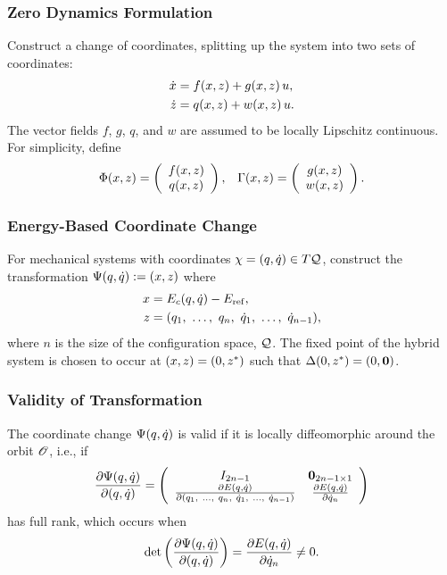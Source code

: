 \begin{frame}[t]
  \frametitle{Zero Dynamics Formulation}
  Construct a change of coordinates, splitting up the system into two sets of coordinates:
  \begin{align*}
    \dot {x} &= f(x, z) + g(x, z) \, u,\\
    \dot {z} &= q(x, z) + w(x, z) \, u.
  \end{align*}
  The vector fields $f$, $g$, $q$, and $w$ are assumed to be locally Lipschitz
  continuous. For simplicity, define
  \begin{align*}
    \Phi(x, z) = \left(\begin{array}{c}
        f(x, z)\\
        q(x, z)
      \end{array}\right),&&
    \Gamma (x, z) = \left(\begin{array}{c}
        g(x, z)\\
        w(x, z)
      \end{array}\right).
  \end{align*}
\end{frame}

\begin{frame}[t]
  \frametitle{Energy-Based Coordinate Change}
  For mechanical systems with coordinates $\chi = (q, \dot q) \in T\mathcal{Q}$, construct the transformation $\Psi(q, \dot q) := (x, z)$ where
  \begin{align*}
    x &= E_{c}(q, \dot q) - E_{\mathrm{ref}},\\
    z &= (q_{1}, \ \ldots, \ q_{n}, \ \dot q_{1}, \ \ldots, \ \dot q_{n-1}),
  \end{align*}
  where $n$ is the size of the configuration space, $\mathcal{Q}$. The fixed point of the
  hybrid system is chosen to occur at $(x, z) = (0, z^{*})$ such that $\Delta(0, z^{*}) =
  (0, {\mathbf 0})$.
\end{frame}

\begin{frame}[t]
  \frametitle{Validity of Transformation}
  The coordinate change $\Psi(q, \dot q)$ is valid if it is locally diffeomorphic around the orbit
  $\mathscr O$, i.e., if
  \begin{align}
    \frac{\partial{\Psi(\ensuremath{q}, \ensuremath{\dot q})}}{\partial{(\ensuremath{q}, \ensuremath{\dot q})}} =
    \left(\begin{array}{c c}
        I_{2n-1} & {\mathbf 0}_{2n-1 \times 1}\\
        \frac{\partial{E(\ensuremath{q}, \ensuremath{\dot q})}}{\partial{(\ensuremath{q}_{1}, \ \ldots, \ q_{n}, \ \ensuremath{\dot q}_{1}, \ \ldots, \ \ensuremath{\dot q}_{n-1})}} & \frac{\partial{E(\ensuremath{q}, \ensuremath{\dot q})}}{\partial{\ensuremath{\dot q}_{n}}}
      \end{array}\right)
  \end{align}
  has full rank, which occurs when
  \begin{align*}
    \det\left(\frac{\partial{\Psi(\ensuremath{q}, \ensuremath{\dot q})}}{\partial{(\ensuremath{q}, \ensuremath{\dot q})}}\right) = \frac{\partial{E(\ensuremath{q}, \ensuremath{\dot q})}}{\partial{\ensuremath{\dot q}_{n}}} \ne 0.
  \end{align*}
\end{frame}

